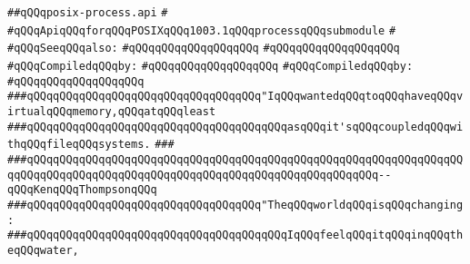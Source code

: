 \label{src/lib/std/src/psx/posix-process.api}
\verb|##qQQqposix-process.api|\newline
\verb|#|\newline
\verb|#qQQqApiqQQqforqQQqPOSIXqQQq1003.1qQQqprocessqQQqsubmodule|\newline
\verb|#|\newline
\verb|#qQQqSeeqQQqalso:|\newline
\verb|#qQQqqQQqqQQqqQQqqQQq|\newline
\verb|#qQQqqQQqqQQqqQQqqQQq|\newline
\newline
\verb|#qQQqCompiledqQQqby:|\newline
\verb|#qQQqqQQqqQQqqQQqqQQq|\newline
\newline
\newline
\verb|#qQQqCompiledqQQqby:|\newline
\verb|#qQQqqQQqqQQqqQQqqQQq|\newline
\newline
\newline
\newline
\newline
\newline
\newline
\verb|###qQQqqQQqqQQqqQQqqQQqqQQqqQQqqQQqqQQq"IqQQqwantedqQQqtoqQQqhaveqQQqvirtualqQQqmemory,qQQqatqQQqleast|\newline
\verb|###qQQqqQQqqQQqqQQqqQQqqQQqqQQqqQQqqQQqqQQqasqQQqit'sqQQqcoupledqQQqwithqQQqfileqQQqsystems.|\newline
\verb|###|\newline
\verb|###qQQqqQQqqQQqqQQqqQQqqQQqqQQqqQQqqQQqqQQqqQQqqQQqqQQqqQQqqQQqqQQqqQQqqQQqqQQqqQQqqQQqqQQqqQQqqQQqqQQqqQQqqQQqqQQqqQQqqQQqqQQq--qQQqKenqQQqThompsonqQQq|\newline
\newline
\newline
\newline
\verb|###qQQqqQQqqQQqqQQqqQQqqQQqqQQqqQQqqQQq"TheqQQqworldqQQqisqQQqchanging:|\newline
\verb|###qQQqqQQqqQQqqQQqqQQqqQQqqQQqqQQqqQQqqQQqIqQQqfeelqQQqitqQQqinqQQqtheqQQqwater,|\newline
